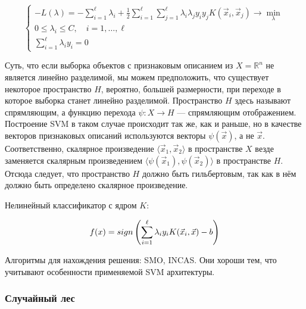 \begin{equation*}
\begin{cases}
    -L(\lambda) = -\sum\limits_{i=1}^\ell \lambda_i + \frac{1}{2} \sum\limits_{i=1}^\ell \sum\limits_{j=1}^\ell \lambda_i \lambda_j y_i y_j K(\vec{x}_i, \vec{x}_j) \to \min\limits_\lambda \\
    0 \leq \lambda_i \leq C, \quad i = 1, \ldots, \ell \\
    \sum\limits_{i=1}^\ell \lambda_i y_i = 0
\end{cases}
\end{equation*}

Суть, что если выборка объектов с признаковым описанием из $X = \mathbb{R}^n$ не является линейно разделимой, мы можем предположить, что существует некоторое пространство $H$, вероятно, большей размерности, при переходе в которое выборка станет линейно разделимой. Пространство $H$ здесь называют спрямляющим, а функцию перехода $\psi : X \to H$ — спрямляющим отображением. Построение SVM в таком случае происходит так же, как и раньше, но в качестве векторов признаковых описаний используются векторы $\psi(\vec{x})$, а не $\vec{x}$. Соответственно, скалярное произведение $\langle \vec{x}_1, \vec{x}_2 \rangle$ в пространстве $X$ везде заменяется скалярным произведением $\langle \psi(\vec{x}_1), \psi(\vec{x}_2) \rangle$ в пространстве $H$. Отсюда следует, что пространство $H$ должно быть гильбертовым, так как в нём должно быть определено скалярное произведение.

\bigskip
Нелинейный классификатор с ядром $K$:

$$f(x) = sign \left(\sum\limits_{i=1}^\ell \lambda_i y_i K(\vec{x}_i, \vec{x})\color{black} - b\right)$$

\bigskip
Алгоритмы для нахождения решения: SMO, INCAS. Они хороши тем, что учитывают особенности применяемой SVM архитектуры.














\subsubsection{Случайный лес}
























